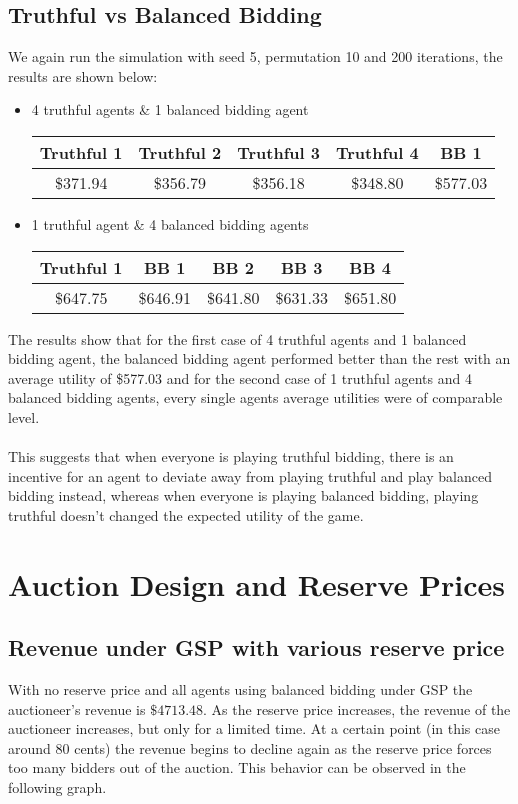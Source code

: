 \documentclass[11pt]{article}
\begin{document}
\subsection{Truthful vs Balanced Bidding}
We again run the simulation with seed 5, permutation 10 and 200 iterations, the results are shown below:
\begin{itemize}
	\item 4 truthful agents \& 1 balanced bidding agent
		\begin{center}
		\begin{tabular}{| c | c | c | c | c | }
			\hline
			Truthful 1 & Truthful 2 & Truthful 3 & Truthful 4 & BB 1\\ \hline
			\$371.94 & \$356.79 & \$356.18 & \$348.80 & \$577.03 \\ \hline
		\end{tabular}
		\end{center}
	\item 1 truthful agent \& 4 balanced bidding agents
		\begin{center}
		\begin{tabular}{| c | c | c | c | c | }
			\hline
			Truthful 1 & BB 1 & BB 2 & BB 3 & BB 4 \\ \hline
			\$647.75 & \$646.91 & \$641.80 & \$631.33 & \$651.80 \\ \hline
		\end{tabular}
		\end{center}
\end{itemize}
The results show that for the first case of 4 truthful agents and 1 balanced bidding agent, the balanced bidding agent performed better than the rest with an average utility of \$577.03 and for the second case of 1 truthful agents and 4 balanced bidding agents, every single agents average utilities were of comparable level.
\\
\\
This suggests that when everyone is playing truthful bidding, there is an incentive for an agent to deviate away from playing truthful and play balanced bidding instead, whereas when everyone is playing balanced bidding, playing truthful doesn't changed the expected utility of the game.
\section{Auction Design and Reserve Prices}
\subsection{Revenue under GSP with various reserve price}
With no reserve price and all agents using balanced bidding under GSP the auctioneer's revenue is $\$4713.48$. As the reserve price increases, the revenue of the auctioneer increases, but only for a limited time. At a certain point (in this case around $80$ cents) the revenue begins to decline again as the reserve price forces too many bidders out of the auction. This behavior can be observed in the following graph.
\end{document}
